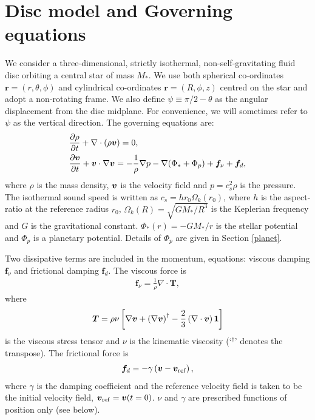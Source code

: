 \section{Disc model and Governing equations}
We consider a three-dimensional, strictly isothermal,
non-self-gravitating fluid disc orbiting a central 
star of mass $M_*$. We use both spherical co-ordinates
$\bm{r}=(r,\theta,\phi)$ and cylindrical co-ordinates  
$\bm{r}=(R, \phi, z)$ centred on the star and 
adopt a non-rotating frame. We also define $\psi \equiv \pi/2 -
\theta$ as the angular displacement from the disc midplane. For
convenience, we will sometimes refer to $\psi$ as the vertical
direction. The governing equations are: 
\begin{align}
&\frac{\partial\rho}{\partial t} + \nabla\cdot\left(\rho\bm{v}\right) =
  0,\label{cont_eq}\\ 
&\frac{\partial\bm{v}}{\partial t} + \bm{v}\cdot\nabla\bm{v} = -\frac{1}{\rho}\nabla
  p -\nabla{\left(\Phi_*+\Phi_p\right)} +\bm{f}_\nu + \bm{f}_d,    
\end{align}
where $\rho$ is the mass density, $\bm{v}$ is the velocity field and 
$p=c_s^2\rho$ is the pressure. The isothermal sound speed is written
as $c_s = hr_0\Omega_k(r_0)$, where $h$ is the aspect-ratio at the reference radius $r_0$, 
$\Omega_k(R) = \sqrt{GM_*/R^3}$ is the Keplerian frequency and $G$ is the gravitational constant. 
$\Phi_*(r) = -GM_*/r $ is the stellar potential and $\Phi_p$ is a 
planetary potential. Details of $\Phi_p$ are given in Section
\ref{planet}. 

Two dissipative terms are included in the momentum, equations: viscous
damping $\bm{f}_\nu$ and frictional damping $\bm{f}_d$. The viscous
force is 
\begin{align}
  \bm{f}_\nu = \frac{1}{\rho}\nabla\cdot\bm{T},
\end{align}
where 
\begin{align}
  \bm{T} = \rho\nu \left[\nabla\bm{v} + \left(\nabla\bm{v}\right)^\dagger
    - \frac{2}{3}\left(\nabla\cdot\bm{v}\right)\bm{1} \right]
\end{align}
is the viscous stress tensor and $\nu$ is the kinematic viscosity 
(`$^\dagger$' denotes the transpose). The frictional force is 
\begin{align}
  \bm{f}_d = -\gamma\left(\bm{v} - \bm{v}_\mathrm{ref}\right),
\end{align}
where $\gamma$ is the damping coefficient and the reference velocity field is taken 
to be the initial velocity field, 
$\bm{v}_\mathrm{ref}=\bm{v}(t=0)$. %
$\nu$ and $\gamma$ are prescribed functions of position only (see
below). %

